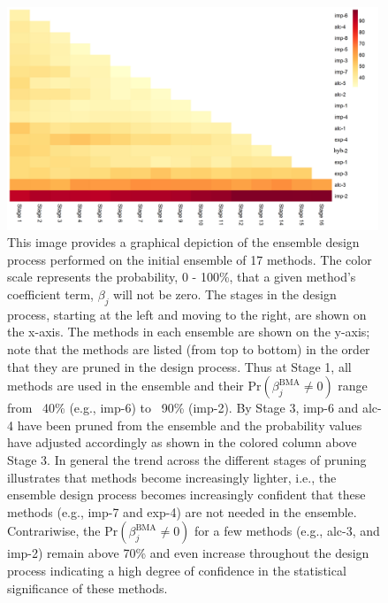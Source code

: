 \documentclass[12pt]{article}
\newcommand{\+}[1]{\ensuremath{\mathbf{#1}}}
\begin{document}
\begin{figure}[h!]
	\centering
	\includegraphics[keepaspectratio,width=0.99\textwidth]{Figures/P_Not_Zero_Per_Stage}
	\caption{This image provides a graphical depiction of the ensemble design process performed on the initial ensemble of 17 methods. The color scale represents the probability, 0 - 100\%, that a given method's coefficient term, $\beta_j$ will not be zero. The stages in the design process, starting at the left and moving to the right, are shown on the x-axis. The methods in each ensemble are shown on the y-axis; note that the methods are listed (from top to bottom) in the order that they are pruned in the design process. Thus at Stage 1, all methods are used in the ensemble and their $\mathrm{Pr}(\beta_j^{\text{BMA}}\neq 0) $ range from ~40\% (e.g., imp-6) to ~90\% (imp-2). By Stage 3, imp-6 and alc-4 have been pruned from the ensemble and the probability values have adjusted accordingly as shown in the colored column above Stage 3. In general the trend across the different stages of pruning illustrates that methods become increasingly lighter, i.e., the ensemble design process becomes increasingly confident that these methods (e.g., imp-7 and exp-4) are not needed in the ensemble. Contrariwise, the $\mathrm{Pr}(\beta_j^{\text{BMA}}\neq 0) $ for a few methods (e.g., alc-3, and imp-2) remain above 70\% and even increase throughout the design process indicating a high degree of confidence in the statistical significance of these methods.}
	\label{Analysis:Figure3:P-not}
\end{figure}
\end{document}
